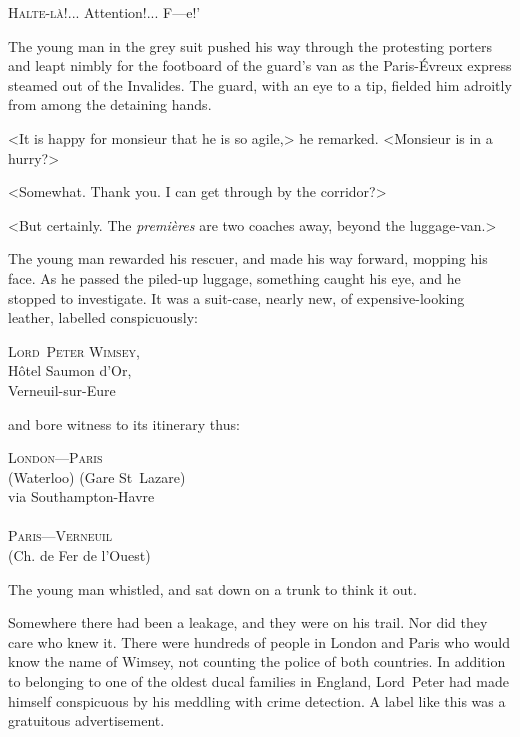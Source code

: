 
\lettrine[ante=‘]{H}{alte-là!}... Attention!... F—e!'

\zz
The young man in the grey suit pushed his way through the protesting porters and leapt nimbly for the footboard of the guard's van as the Paris-Évreux express steamed out of the Invalides. The guard, with an eye to a tip, fielded him adroitly from among the detaining hands.

<It is happy for monsieur that he is so agile,> he remarked. <Monsieur is in a hurry?>

<Somewhat. Thank you. I can get through by the corridor?>

<But certainly. The \textit{premières} are two coaches away, beyond the luggage-van.>

The young man rewarded his rescuer, and made his way forward, mopping his face. As he passed the piled-up luggage, something caught his eye, and he stopped to investigate. It was a suit-case, nearly new, of expensive-looking leather, labelled conspicuously:

\vspace{-0.2cm}

\begin{center}
\textsc{Lord~Peter Wimsey},\\
Hôtel Saumon d'Or,\\
Verneuil-sur-Eure
\end{center}

\vspace{-0.2cm}
\noindent and bore witness to its itinerary thus:
\vspace{-0.2cm}

\begin{center}
\textsc{London—Paris}\\
(Waterloo) (Gare St~Lazare)\\
via Southampton-Havre\\
~\\
\textsc{Paris—Verneuil}\\
(Ch. de Fer de l'Ouest)
\end{center}

The young man whistled, and sat down on a trunk to think it out.

Somewhere there had been a leakage, and they were on his trail. Nor did they care who knew it. There were hundreds of people in London and Paris who would know the name of Wimsey, not counting the police of both countries. In addition to belonging to one of the oldest ducal families in England, Lord~Peter had made himself conspicuous by his meddling with crime detection. A label like this was a gratuitous advertisement.

